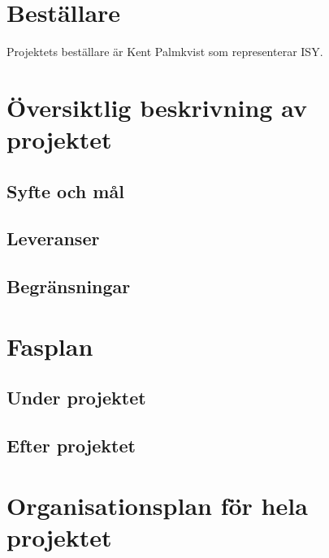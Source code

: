 \documentclass[11pt]{article}
\begin{document}
\pagebreak


\begin{flushleft}

\section{Beställare}
Projektets beställare är Kent Palmkvist som representerar ISY.
\pagebreak

\section{Översiktlig beskrivning av projektet}

\subsection{Syfte och mål}
\subsection{Leveranser}

\subsection{Begränsningar}
\pagebreak

\section{Fasplan}
\subsection{Under projektet}

\subsection{Efter projektet}

\pagebreak

\section{Organisationsplan för hela projektet}


\end{flushleft}
\end{document}
